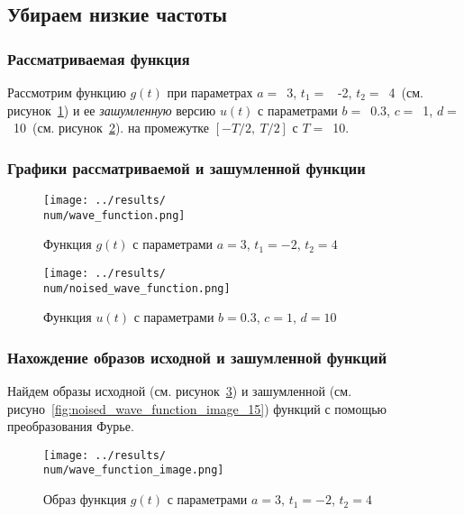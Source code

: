 \subsection{Убираем низкие частоты}

\def\num{15}
\def\a{3}
\def\from{-2}
\def\to{4}
\def\b{0.3}
\def\c{1}
\def\d{10}
\def\T{10}
\def\imageclip{8}


\subsubsection{Рассматриваемая функция}
Рассмотрим функцию $g(t)$ при параметрах $a=$~\a, $t_1 =$~ \from, $t_2 =$~\to ~(см. рисунок~\ref{fig:wave_function_\num}) 
и ее \textit{зашумленную} версию $u(t)$ с параметрами $b =$~\b, $c =$~\c, $d =$~\d ~(см. рисунок~\ref{fig:noised_wave_function_\num}).
на промежутке $[-T/2,~T/2]$ с $T =$~\T.

\FloatBarrier
\subsubsection{Графики рассматриваемой и зашумленной функции}
\begin{figure}[ht!]
    \centering
    \texttt{[image: ../results/\\num/wave\_function.png]}
    \caption{Функция $g(t)$ с параметрами $a = \a$, $t_1 = \from$, $t_2 = \to$}
    \label{fig:wave_function_\num}
\end{figure}

\begin{figure}[ht!]
    \centering
    \texttt{[image: ../results/\\num/noised\_wave\_function.png]}
    \caption{Функция $u(t)$ с параметрами $b = \b$, $c = \c$, $d = \d$}
    \label{fig:noised_wave_function_\num}
\end{figure}

\FloatBarrier
\subsubsection{Нахождение образов исходной и зашумленной функций}
Найдем образы исходной (см. рисунок~\ref{fig:wave_function_image_\num}) 
и зашумленной (см. рисуно~\ref{fig:noised_wave_function_image_\num}) функций с помощью преобразования Фурье. 

\begin{figure}[ht!]
    \centering
    \texttt{[image: ../results/\\num/wave\_function\_image.png]}
    \caption{Образ функция $g(t)$ с параметрами $a = \a$, $t_1 = \from$, $t_2 = \to$}
    \label{fig:wave_function_image_\num}
\end{figure}

